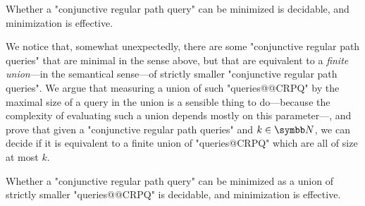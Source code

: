 \begin{contribution}
	Whether a "conjunctive regular path query" can be minimized is decidable,
	and minimization is effective.
\end{contribution}

We notice that, somewhat unexpectedly, there are some "conjunctive regular path queries"
that are minimal in the sense above, but that are equivalent to a \emph{finite union}---in the 
semantical sense---of strictly smaller "conjunctive regular path queries".%
We argue that measuring a union of such "queries@@CRPQ" by the maximal size
of a query in the union is a sensible thing to do---because the complexity
of evaluating such a union depends mostly on this parameter---, and prove
that given a "conjunctive regular path queries" and $k\in\N$, we can
decide if it is equivalent to a finite union of
"queries@CRPQ" which are all of size at most $k$.

\begin{contribution}
	Whether a "conjunctive regular path query" can be minimized
	as a union of strictly smaller "queries@@CRPQ" is decidable,
	and minimization is effective.
\end{contribution}

